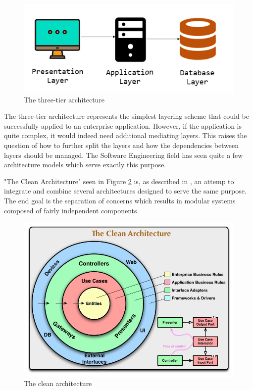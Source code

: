 \begin{figure}[H]
    \centering
    \includegraphics[width=5in]{images/threeTierArchitecture}
    \caption{The three-tier architecture \cite{threeTierArchitecture}}
    \label{threeTierArchitecture}
\end{figure}

The three-tier architecture represents the simplest layering scheme that could be successfully applied to an enterprise application. However, if the application is quite complex, it would indeed need additional mediating layers. This raises the question of how to further split the layers and how the dependencies between layers should be managed. The Software Engineering field has seen quite a few architecture models which serve exactly this purpose.

"The Clean Architecture" seen in Figure \ref{cleanArchitectureImg} is, as described in \cite{cleanArchitecture}, an attemp to integrate and combine several architectures designed to serve the same purpose. The end goal is the separation of concerns which results in modular systems composed of fairly independent components.

\begin{figure}[H]
    \centering
    \includegraphics[width=6in]{images/cleanArchitecture}
    \caption{The clean architecture \cite{cleanArchitecture}}
    \label{cleanArchitectureImg}
\end{figure}

